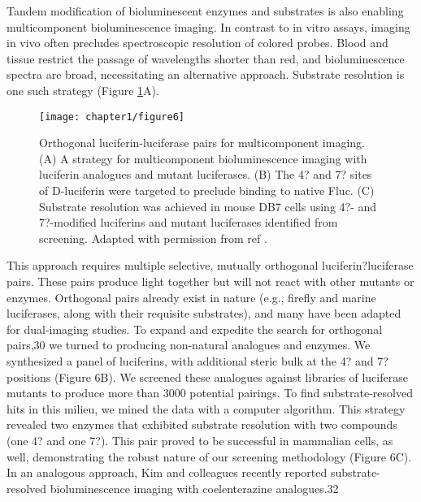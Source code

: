 Tandem modification of bioluminescent enzymes and
substrates is also enabling multicomponent bioluminescence
imaging. In contrast to in vitro assays, imaging in vivo often
precludes spectroscopic resolution of colored probes. Blood
and tissue restrict the passage of wavelengths shorter than red,\cite{Zhao:2005if}
and bioluminescence spectra are broad,\cite{Rumyantsev:2016fd} necessitating an
alternative approach. Substrate resolution is one such strategy
(Figure \ref{fig:jacs_summary}A). 

\begin{figure}[htbp]
\texttt{[image: chapter1/figure6]}
\centering
\caption[Orthogonal luciferin-luciferase pairs for multicomponent imaging]{Orthogonal luciferin-luciferase pairs for multicomponent imaging. (A) A strategy for multicomponent bioluminescence imaging with
luciferin analogues and mutant luciferases. (B) The 4? and 7? sites of D-luciferin were targeted to preclude binding to native Fluc. (C) Substrate
resolution was achieved in mouse DB7 cells using 4?- and 7?-modified luciferins and mutant luciferases identified from screening. Adapted with
permission from ref \cite{Jones:2017be}.}
  \label{fig:jacs_summary}
\end{figure}

This approach requires multiple selective,
mutually orthogonal luciferin?luciferase pairs. These pairs
produce light together but will not react with other mutants or
enzymes. Orthogonal pairs already exist in nature (e.g., firefly
and marine luciferases, along with their requisite substrates),
and many have been adapted for dual-imaging studies.
To expand and expedite the search for orthogonal pairs,30 we
turned to producing non-natural analogues and enzymes. We
synthesized a panel of luciferins, with additional steric bulk at
the 4? and 7? positions (Figure 6B). We screened these
analogues against libraries of luciferase mutants to produce
more than 3000 potential pairings. To find substrate-resolved
hits in this milieu, we mined the data with a computer
algorithm. This strategy revealed two enzymes that exhibited
substrate resolution with two compounds (one 4? and one 7?).
This pair proved to be successful in mammalian cells, as well,
demonstrating the robust nature of our screening methodology
(Figure 6C). In an analogous approach, Kim and colleagues
recently reported substrate-resolved bioluminescence imaging
with coelenterazine analogues.32
